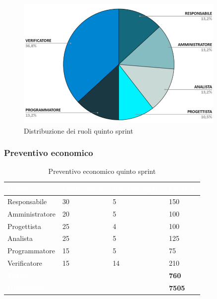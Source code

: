 \begin{figure}[h!]
    \centering
    \includegraphics[width=0.9\textwidth]{prev5ruoli.png}
    \caption{Distribuzione dei ruoli quinto sprint}
    \label{fig:preventivoorarioquintosprint}
\end{figure}

\subsubsection{Preventivo economico}
{
\setlength{\tabcolsep}{10pt}
\renewcommand{\arraystretch}{1.5}
\begin{table}[h]
    \centering
    \begin{tabularx}{\textwidth}{| l | l | l | X |}
        \hline
        \rowcolor{headerrow} \textbf{\textcolor{white}{Ruolo}} & \textbf{\textcolor{white}{Costo orario}} & \textbf{\textcolor{white}{Ore impiegate}} & \textbf{\textcolor{white}{Costo €}} \\
        \hline
        Responsabile & 30 & 5 & 150\\
        \hline
        Amministratore & 20 & 5 & 100\\
        \hline
        Progettista& 25 & 4 & 100\\
        \hline
        Analista & 25 & 5 & 125\\
        \hline
        Programmatore & 15 & 5 & 75\\
        \hline
        Verificatore & 15 & 14 & 210\\
        \hline
        \cellcolor{headerrow} \textbf{\textcolor{white}{Totale}} &  &  & \textbf{760}\\
        \hline
        \cellcolor{headerrow} \textbf{\textcolor{white}{Rimanente}} &  &  & \textbf{7505}\\
        \hline
    \end{tabularx}
    \caption{Preventivo economico quinto sprint}
    \label{tab:preventivocostiquintosprint}
\end{table}
}

